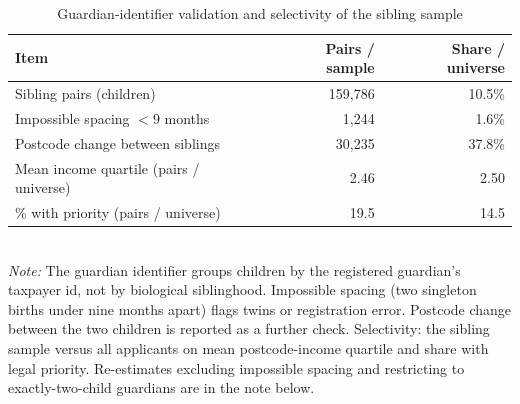 \begin{table}[htbp]\centering
\caption{Guardian-identifier validation and selectivity of the sibling sample}
\label{tab:P4guard}
\footnotesize
\setlength{\tabcolsep}{4pt}
\begin{tabular}{lrr}
\toprule
Item & Pairs / sample & Share / universe \\
\midrule
Sibling pairs (children) & 159,786 & 10.5\% \\
Impossible spacing $<9$ months & 1,244 & 1.6\% \\
Postcode change between siblings & 30,235 & 37.8\% \\
Mean income quartile (pairs / universe) & 2.46 & 2.50 \\
\% with priority (pairs / universe) & 19.5 & 14.5 \\
\bottomrule
\end{tabular}
\\[3pt]{\footnotesize \textit{Note:} The guardian identifier groups children by the registered guardian's taxpayer id, not by biological siblinghood. Impossible spacing (two singleton births under nine months apart) flags twins or registration error. Postcode change between the two children is reported as a further check. Selectivity: the sibling sample versus all applicants on mean postcode-income quartile and share with legal priority. Re-estimates excluding impossible spacing and restricting to exactly-two-child guardians are in the note below.}
\end{table}
